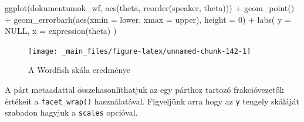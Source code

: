 \documentclass[
]{book}
\newenvironment{Shaded}{\begin{snugshade}}{\end{snugshade}}
\newcommand{\AttributeTok}[1]{\textcolor[rgb]{0.77,0.63,0.00}{#1}}
\newcommand{\ConstantTok}[1]{\textcolor[rgb]{0.00,0.00,0.00}{#1}}
\newcommand{\DecValTok}[1]{\textcolor[rgb]{0.00,0.00,0.81}{#1}}
\newcommand{\FloatTok}[1]{\textcolor[rgb]{0.00,0.00,0.81}{#1}}
\newcommand{\FunctionTok}[1]{\textcolor[rgb]{0.00,0.00,0.00}{#1}}
\newcommand{\NormalTok}[1]{#1}
\newcommand{\OtherTok}[1]{\textcolor[rgb]{0.56,0.35,0.01}{#1}}
\newcommand{\SpecialCharTok}[1]{\textcolor[rgb]{0.00,0.00,0.00}{#1}}
\begin{document}
\begin{Shaded}
\end{Shaded}

\begin{Shaded}
\begin{Highlighting}[]
\FunctionTok{ggplot}\NormalTok{(dokumentumok\_wf, }\FunctionTok{aes}\NormalTok{(theta, }\FunctionTok{reorder}\NormalTok{(speaker, theta))) }\SpecialCharTok{+}
  \FunctionTok{geom\_point}\NormalTok{() }\SpecialCharTok{+}
  \FunctionTok{geom\_errorbarh}\NormalTok{(}\FunctionTok{aes}\NormalTok{(}\AttributeTok{xmin =}\NormalTok{ lower, }\AttributeTok{xmax =}\NormalTok{ upper), }\AttributeTok{height =} \DecValTok{0}\NormalTok{) }\SpecialCharTok{+}
  \FunctionTok{labs}\NormalTok{(}
    \AttributeTok{y =} \ConstantTok{NULL}\NormalTok{,}
    \AttributeTok{x =} \FunctionTok{expression}\NormalTok{(theta)}
\NormalTok{  )}
\end{Highlighting}
\end{Shaded}

\begin{figure}

{\centering \texttt{[image: \_main\_files/figure-latex/unnamed-chunk-142-1]} 

}

\caption{A Wordfish skála eredménye}\label{fig:unnamed-chunk-142}
\end{figure}

A párt metaadattal összehasonlíthatjuk az egy párthoz tartozó
frakcióvezetők értékeit a \texttt{facet\_wrap()} használatával.
Figyeljünk arra hogy az \texttt{y} tengely skáláját szabadon hagyjuk a
\texttt{scales} opcióval.
\end{document}
